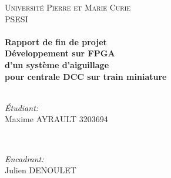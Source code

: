 \begin{titlepage}

\center %
 

\textsc{\LARGE Universit\'e Pierre et Marie Curie}\\[1.5cm] %
\textsc{\Large PSESI}\\[0.5cm] %


\HRule \\[0.4cm]
{ \huge \bfseries Rapport de fin de projet}\\[0.4cm] %
{ \huge \bfseries D\'eveloppement sur FPGA \\d'un système d'aiguillage
  \\pour centrale DCC sur train miniature}\\[0.4cm] %
\HRule \\[1.5cm]
 

\begin{minipage}{0.4\textwidth}
\begin{flushleft} \large
\emph{\'Etudiant:}\\
Maxime \textsc{AYRAULT} 3203694 %
\end{flushleft}
\end{minipage}
~
\begin{minipage}{0.4\textwidth}
\begin{flushright} \large
\emph{Encadrant:} \\
Julien \textsc{DENOULET} %
\end{flushright}
\end{minipage}\\[2cm]



\end{titlepage}
